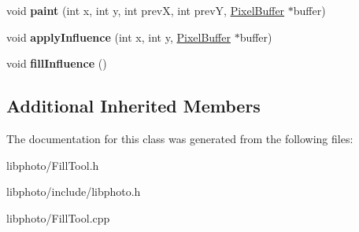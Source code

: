 \begin{DoxyCompactItemize}
\item 
\hypertarget{classFillTool_a81a3a46e5600d6250634766e8b769796}{void {\bfseries paint} (int x, int y, int prev\-X, int prev\-Y, \hyperlink{classPixelBuffer}{Pixel\-Buffer} $\ast$buffer)}\label{classFillTool_a81a3a46e5600d6250634766e8b769796}

\item 
\hypertarget{classFillTool_a8ad4d0d5b2a5379be3720c89a102ddb3}{void {\bfseries apply\-Influence} (int x, int y, \hyperlink{classPixelBuffer}{Pixel\-Buffer} $\ast$buffer)}\label{classFillTool_a8ad4d0d5b2a5379be3720c89a102ddb3}

\item 
\hypertarget{classFillTool_a888fd877cf0937e9b36be2d56f06de3e}{void {\bfseries fill\-Influence} ()}\label{classFillTool_a888fd877cf0937e9b36be2d56f06de3e}

\end{DoxyCompactItemize}
\subsection*{Additional Inherited Members}


The documentation for this class was generated from the following files\-:\begin{DoxyCompactItemize}
\item 
libphoto/Fill\-Tool.\-h\item 
libphoto/include/libphoto.\-h\item 
libphoto/Fill\-Tool.\-cpp\end{DoxyCompactItemize}
